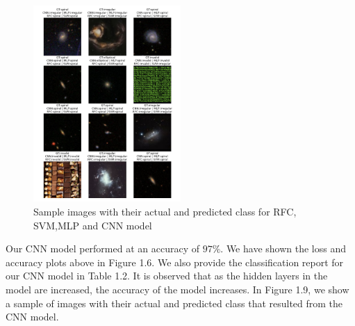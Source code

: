 \begin{figure}[H]
    \centering
    \includegraphics[width=0.5\textwidth]{Images/sample-images.png}
    \caption{Sample images with their actual and predicted class for RFC, SVM,MLP and CNN model}
\end{figure}











Our CNN model performed at an accuracy of $97 \%$. We have shown the loss and accuracy plots above in Figure 1.6. We also provide the classification report for our CNN model in Table 1.2. It is observed that as the hidden layers in the model are increased, the accuracy of the model increases. In Figure 1.9, we show a sample of images with their actual and predicted class that resulted from the CNN model.